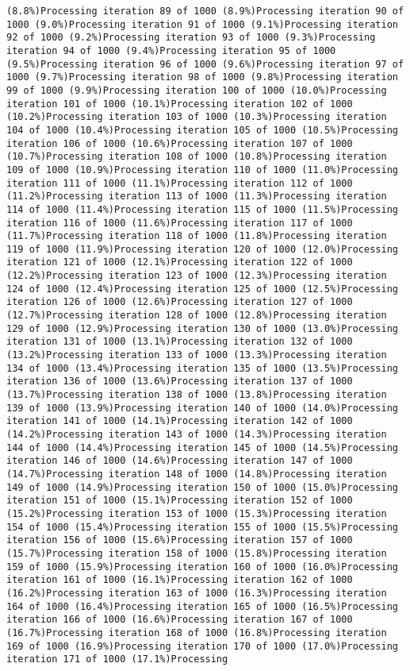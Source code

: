 \documentclass[
]{article}
\begin{document}
\begin{verbatim}
(8.8%)Processing iteration 89 of 1000 (8.9%)Processing iteration 90 of 1000 (9.0%)Processing iteration 91 of 1000 (9.1%)Processing iteration 92 of 1000 (9.2%)Processing iteration 93 of 1000 (9.3%)Processing iteration 94 of 1000 (9.4%)Processing iteration 95 of 1000 (9.5%)Processing iteration 96 of 1000 (9.6%)Processing iteration 97 of 1000 (9.7%)Processing iteration 98 of 1000 (9.8%)Processing iteration 99 of 1000 (9.9%)Processing iteration 100 of 1000 (10.0%)Processing iteration 101 of 1000 (10.1%)Processing iteration 102 of 1000 (10.2%)Processing iteration 103 of 1000 (10.3%)Processing iteration 104 of 1000 (10.4%)Processing iteration 105 of 1000 (10.5%)Processing iteration 106 of 1000 (10.6%)Processing iteration 107 of 1000 (10.7%)Processing iteration 108 of 1000 (10.8%)Processing iteration 109 of 1000 (10.9%)Processing iteration 110 of 1000 (11.0%)Processing iteration 111 of 1000 (11.1%)Processing iteration 112 of 1000 (11.2%)Processing iteration 113 of 1000 (11.3%)Processing iteration 114 of 1000 (11.4%)Processing iteration 115 of 1000 (11.5%)Processing iteration 116 of 1000 (11.6%)Processing iteration 117 of 1000 (11.7%)Processing iteration 118 of 1000 (11.8%)Processing iteration 119 of 1000 (11.9%)Processing iteration 120 of 1000 (12.0%)Processing iteration 121 of 1000 (12.1%)Processing iteration 122 of 1000 (12.2%)Processing iteration 123 of 1000 (12.3%)Processing iteration 124 of 1000 (12.4%)Processing iteration 125 of 1000 (12.5%)Processing iteration 126 of 1000 (12.6%)Processing iteration 127 of 1000 (12.7%)Processing iteration 128 of 1000 (12.8%)Processing iteration 129 of 1000 (12.9%)Processing iteration 130 of 1000 (13.0%)Processing iteration 131 of 1000 (13.1%)Processing iteration 132 of 1000 (13.2%)Processing iteration 133 of 1000 (13.3%)Processing iteration 134 of 1000 (13.4%)Processing iteration 135 of 1000 (13.5%)Processing iteration 136 of 1000 (13.6%)Processing iteration 137 of 1000 (13.7%)Processing iteration 138 of 1000 (13.8%)Processing iteration 139 of 1000 (13.9%)Processing iteration 140 of 1000 (14.0%)Processing iteration 141 of 1000 (14.1%)Processing iteration 142 of 1000 (14.2%)Processing iteration 143 of 1000 (14.3%)Processing iteration 144 of 1000 (14.4%)Processing iteration 145 of 1000 (14.5%)Processing iteration 146 of 1000 (14.6%)Processing iteration 147 of 1000 (14.7%)Processing iteration 148 of 1000 (14.8%)Processing iteration 149 of 1000 (14.9%)Processing iteration 150 of 1000 (15.0%)Processing iteration 151 of 1000 (15.1%)Processing iteration 152 of 1000 (15.2%)Processing iteration 153 of 1000 (15.3%)Processing iteration 154 of 1000 (15.4%)Processing iteration 155 of 1000 (15.5%)Processing iteration 156 of 1000 (15.6%)Processing iteration 157 of 1000 (15.7%)Processing iteration 158 of 1000 (15.8%)Processing iteration 159 of 1000 (15.9%)Processing iteration 160 of 1000 (16.0%)Processing iteration 161 of 1000 (16.1%)Processing iteration 162 of 1000 (16.2%)Processing iteration 163 of 1000 (16.3%)Processing iteration 164 of 1000 (16.4%)Processing iteration 165 of 1000 (16.5%)Processing iteration 166 of 1000 (16.6%)Processing iteration 167 of 1000 (16.7%)Processing iteration 168 of 1000 (16.8%)Processing iteration 169 of 1000 (16.9%)Processing iteration 170 of 1000 (17.0%)Processing iteration 171 of 1000 (17.1%)Processing 
\end{verbatim}
\end{document}
